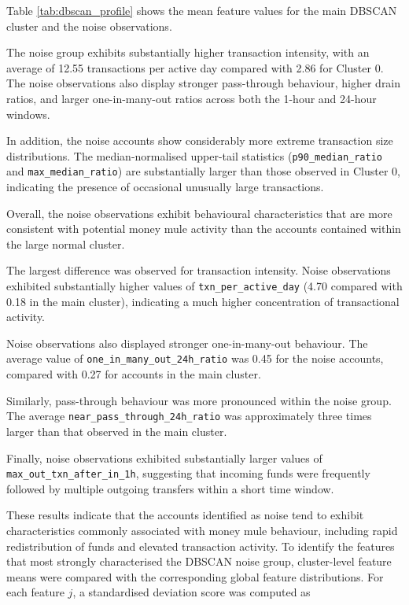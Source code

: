 Table \ref{tab:dbscan_profile} shows the mean feature values for the main DBSCAN cluster and the noise observations.

The noise group exhibits substantially higher transaction intensity, with an average of 12.55 transactions per active day compared with 2.86 for Cluster 0. The noise observations also display stronger pass-through behaviour, higher drain ratios, and larger one-in-many-out ratios across both the 1-hour and 24-hour windows.

In addition, the noise accounts show considerably more extreme transaction size distributions. The median-normalised upper-tail statistics (\texttt{p90\_median\_ratio} and \texttt{max\_median\_ratio}) are substantially larger than those observed in Cluster 0, indicating the presence of occasional unusually large transactions.

Overall, the noise observations exhibit behavioural characteristics that are more consistent with potential money mule activity than the accounts contained within the large normal cluster.

The largest difference was observed for transaction intensity.
Noise observations exhibited substantially higher values of
\texttt{txn\_per\_active\_day}
(4.70 compared with 0.18 in the main cluster),
indicating a much higher concentration of transactional activity.

Noise observations also displayed stronger one-in-many-out behaviour.
The average value of
\texttt{one\_in\_many\_out\_24h\_ratio}
was 0.45 for the noise accounts,
compared with 0.27 for accounts in the main cluster.

Similarly, pass-through behaviour was more pronounced within the noise
group.
The average
\texttt{near\_pass\_through\_24h\_ratio}
was approximately three times larger than that observed in the main
cluster.

Finally, noise observations exhibited substantially larger values of
\texttt{max\_out\_txn\_after\_in\_1h},
suggesting that incoming funds were frequently followed by multiple
outgoing transfers within a short time window.

These results indicate that the accounts identified as noise tend to
exhibit characteristics commonly associated with money mule behaviour,
including rapid redistribution of funds and elevated transaction
activity.
To identify the features that most strongly characterised the DBSCAN noise group,
cluster-level feature means were compared with the corresponding global feature
distributions. For each feature \(j\), a standardised deviation score was computed as

